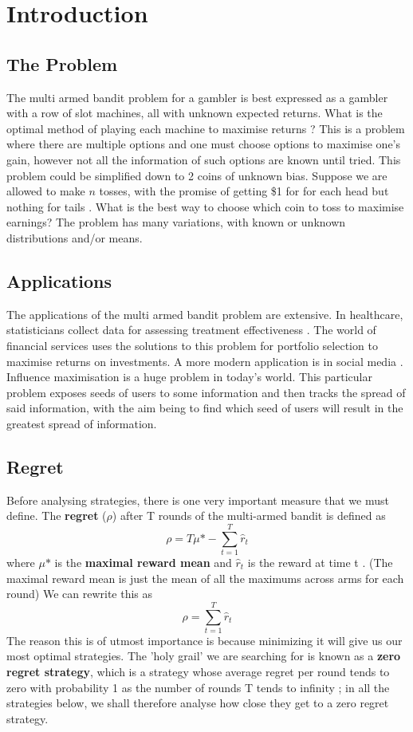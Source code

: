 \section{Introduction}

\subsection{The Problem}
The multi armed bandit problem for a gambler is best expressed as a gambler with a row of slot machines, all with unknown expected returns. What is the optimal method of playing each machine to maximise returns \citep{vermorel}? This is a problem where there are multiple options and one must choose options to maximise one's gain, however not all the information of such options are known until tried.
\newline
\newline
This problem could be simplified down to 2 coins of unknown bias. Suppose we are allowed to make $n$ tosses, with the promise of getting \$1 for for each head but nothing for tails \citep{robbins1952some}. What is the best way to choose which coin to toss to maximise earnings? The problem has many variations, with known or unknown distributions and/or means.

\subsection{Applications}
The applications of the multi armed bandit problem are extensive. In healthcare, statisticians collect data for assessing treatment effectiveness \citep{bouneffouf2019survey}. The world of financial services uses the solutions to this problem for portfolio selection to maximise returns on investments.
\newline
\newline
A more modern application is in social media \citep{chen2013combinatorial}. Influence maximisation is a huge problem in today's world. This particular problem exposes seeds of users to some information and then tracks the spread of said information, with the aim being to find which seed of users will result in the greatest spread of information.

\subsection{Regret}
Before analysing strategies, there is one very important measure that we must define. The \textbf{regret} ($\rho$) after T rounds of the multi-armed bandit is defined as $$\rho = T\mu\mbox{*} - \sum_{t=1}^T\hat{r}_t$$ where $\mu\mbox{*}$ is the \textbf{maximal reward mean} and $\hat{r}_t$ is the reward at time t \citep{vermorel}. (The maximal reward mean is just the mean of all the maximums across arms for each round) We can rewrite this as $$\rho = \sum_{t=1}^T\hat{r}_t$$ The reason this is of utmost importance is because minimizing it will give us our most optimal strategies. The 'holy grail' we are searching for is known as a \textbf{zero regret strategy}, which is a strategy whose average regret per round tends to zero with probability 1 as the number of rounds T tends to infinity \citep{vermorel}; in all the strategies below, we shall therefore analyse how close they get to a zero regret strategy.